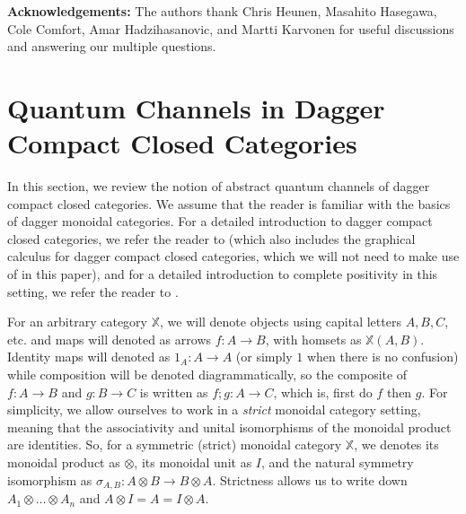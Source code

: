 \documentclass[submission,copyright,creativecommons]{eptcs}
\begin{document}

\textbf{Acknowledgements:} The authors thank Chris Heunen, Masahito Hasegawa, Cole Comfort, Amar Hadzihasanovic, and Martti Karvonen for useful discussions and answering our multiple questions. 

\section{Quantum Channels in Dagger Compact Closed Categories}

In this section, we review the notion of abstract quantum channels of dagger compact closed categories. We assume that the reader is familiar with the basics of dagger monoidal categories. For a detailed introduction to dagger compact closed categories, we refer the reader to \cite{selinger2010survey} (which also includes the graphical calculus for dagger compact closed categories, which we will not need to make use of in this paper), and for a detailed introduction to complete positivity in this setting, we refer the reader to \cite{selinger2007dagger}. 

For an arbitrary category $\mathbb{X}$, we will denote objects using capital letters $A,B,C$, etc. and maps will denoted as arrows $f: A \to B$, with homsets as $\mathbb{X}(A,B)$. Identity maps will denoted as $1_A: A \to A$ (or simply $1$ when there is no confusion) while composition will be denoted diagrammatically, so the composite of $f: A \to B$ and $g: B \to C$ is written as $f;g: A \to C$, which is, first do $f$ then $g$. For simplicity, we allow ourselves to work in a \textit{strict} monoidal category setting, meaning that the associativity and unital isomorphisms of the monoidal product are identities. So, for a symmetric (strict) monoidal category $\mathbb{X}$, we denotes its monoidal product as $\otimes$, its monoidal unit as $I$, and the natural symmetry isomorphism as $\sigma_{A,B}: A \otimes B \to B \otimes A$. Strictness allows us to write down $A_1 \otimes \hdots \otimes A_n$ and $A \otimes I = A = I \otimes A$. 
\end{document}
